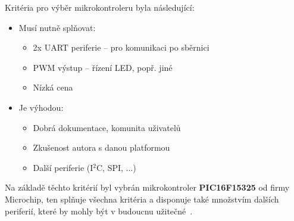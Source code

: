         Kritéria pro výběr mikrokontroleru byla následující:
        \begin{itemize}
            \item Musí nutně splňovat:
            \begin{itemize}
                \item 2x UART periferie -- pro komunikaci po sběrnici 
                \item PWM výstup -- řízení LED, popř. jiné
                \item Nízká cena 
            \end{itemize}
            \item Je výhodou:
            \begin{itemize}
                \item Dobrá dokumentace, komunita uživatelů
                \item Zkušenost autora s danou platformou
                \item Další periferie (I\(^2\)C, SPI, ...)
            \end{itemize}
        \end{itemize}

        Na základě těchto kritérií byl vybrán mikrokontroler \textbf{PIC16F15325} od firmy Microchip, ten splňuje všechna kritéria a disponuje také množstvím dalších periferií, které by mohly být v budoucnu užitečné~\cite{PIC16F15325}. 